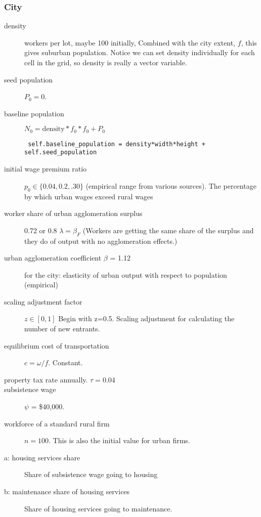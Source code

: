\subsubsection{City}
\begin{description}
\item [density] workers per lot, maybe 100 initially, Combined with the city extent, $f$, this gives suburban population. %
Notice we can set density individually for each cell in the grid, so density is really a vector variable.  %
\item [seed population] $P_0=0$. %
\item [baseline population]  $N_0=\mathrm{density} * f_0 * f_0 + P_0$ 
\begin{lstlisting}
 self.baseline_population = density*width*height + self.seed_population
\end{lstlisting}
\item [initial wage premium ratio] $p_0\in\{0.04,0.2,.30\}$ (empirical range from various sources). The percentage by which urban wages exceed rural wages 
\item [worker share of urban agglomeration surplus] 0.72 or 0.8 $\lambda=\beta_F$ (Workers are getting the same share of the surplus and they do of output with no agglomeration effects.)
\item [urban agglomeration coefficient $\beta$ = 1.12] for the city: elasticity of urban output with respect to population (empirical)

\item [scaling adjustment factor] $z\in[0,1]$ Begin with z=0.5. Scaling adjustment for calculating the number of new entrants. 

\item [equilibrium cost of transportation] $c = \omega/f$. Constant.
\item [property tax rate annually. $\tau=0.04$]
\item [subsistence wage] $\psi$ = \$40,000. %
\item [workforce of a standard rural firm] $n=100$. This is also the initial value for urban firms.

\item[a: housing services share] Share of subsistence wage going to housing 


\item[b: maintenance share  of housing services ] Share of housing services going to maintenance.
\end{description}


